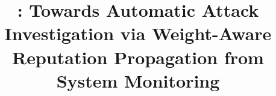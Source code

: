 \documentclass[sigconf, anonymous]{acmart}
\begin{document}





\title{\tool: Towards Automatic Attack Investigation via Weight-Aware Reputation Propagation from System Monitoring}


\maketitle














% 


\end{document}
